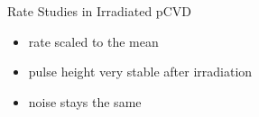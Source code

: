 \begin{frame}{Rate Studies in Irradiated pCVD}

	\vspace*{-15pt}
	
	\begin{itemize}\itemfill
		\item rate scaled to the mean
		\item pulse height very stable after irradiation
		\item noise stays the same
	\end{itemize}

\end{frame}
